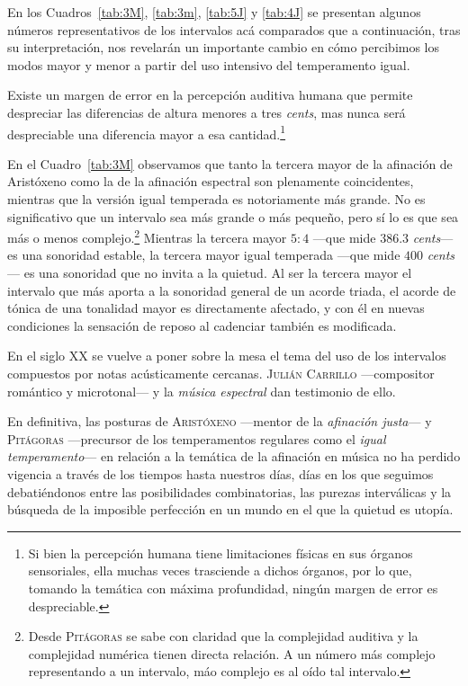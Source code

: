 \documentclass[a4paper,12pt]{article}
\begin{document}
\begin{multicols}{2}
  En los Cuadros~\ref{tab:3M}, \ref{tab:3m}, \ref{tab:5J} y \ref{tab:4J} se presentan algunos números representativos de los intervalos acá comparados que a continuación, tras su interpretación, nos revelarán un importante cambio en cómo percibimos los modos mayor y menor a partir del uso intensivo del temperamento igual.

  Existe un margen de error en la percepción auditiva humana que permite despreciar las diferencias de altura menores a tres \emph{cents}, mas nunca será despreciable una diferencia mayor a esa cantidad.\footnote{Si bien la percepción humana tiene limitaciones físicas en sus órganos sensoriales, ella muchas veces trasciende a dichos órganos, por lo que, tomando la temática con máxima profundidad, ningún margen de error es despreciable.}

  En el Cuadro~\ref{tab:3M} observamos que tanto la tercera mayor de la afinación de Aristóxeno como la de la afinación espectral son plenamente coincidentes, mientras que la versión igual temperada es notoriamente más grande. No es significativo que un intervalo sea más grande o más pequeño, pero sí lo es que sea más o menos complejo.\footnote{Desde \textsc{Pitágoras} se sabe con claridad que la complejidad auditiva y la complejidad numérica tienen directa relación. A un número más complejo representando a un intervalo, máo complejo es al oído tal intervalo.} Mientras la tercera mayor $5:4$ ---que mide $386.3$ \emph{cents}--- es una sonoridad estable, la tercera mayor igual temperada ---que mide $400$ \emph{cents}--- es una sonoridad que no invita a la quietud. Al ser la tercera mayor el intervalo que más aporta a la sonoridad general de un acorde triada, el acorde de tónica de una tonalidad mayor es directamente afectado, y con él en nuevas condiciones la sensación de reposo al cadenciar también es modificada.




  En el siglo XX se vuelve a poner sobre la mesa el tema del uso de los intervalos compuestos por notas acústicamente cercanas. \textsc{Julián Carrillo} ---compositor romántico y microtonal--- y la \emph{música espectral} dan testimonio de ello.

  En definitiva, las posturas de \textsc{Aristóxeno} ---mentor de la \emph{afinación justa}--- y \textsc{Pitágoras} ---precursor de los temperamentos regulares como el \emph{igual temperamento}--- en relación a la temática de la afinación en música no ha perdido vigencia a través de los tiempos hasta nuestros días, días en los que seguimos debatiéndonos entre las posibilidades combinatorias, las purezas interválicas y la búsqueda de la imposible perfección en un mundo en el que la quietud es utopía.

\end{multicols}
\end{document}
